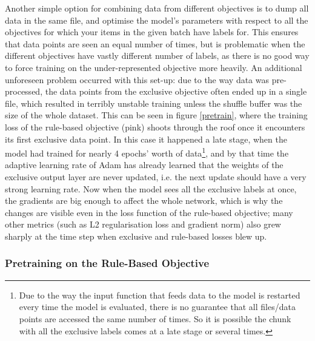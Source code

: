Another simple option for combining data from different objectives is to dump all data in the same file, and optimise the model's parameters with respect to all the objectives for which your items in the given batch have labels for.
This ensures that data points are seen an equal number of times, but is problematic when the different objectives have vastly different number of labels, as there is no good way to force training on the under-represented objective more heavily.
An additional unforeseen problem occurred with this set-up: due to the way data was pre-processed, the data points from the exclusive objective often ended up in a single file, which resulted in terribly unstable training unless the shuffle buffer was the size of the whole dataset.
This can be seen in figure \ref{pretrain}, where the training loss of the rule-based objective (pink) shoots through the roof once it encounters its first exclusive data point.
In this case it happened a late stage, when the model had trained for nearly 4 epochs' worth of data\footnote{Due to the way the input function that feeds data to the model is restarted every time the model is evaluated, there is no guarantee that all files/data points are accessed the same number of times. So it is possible the chunk with all the exclusive labels comes at a late stage or several times.}, and by that time the adaptive learning rate of Adam has already learned that the weights of the exclusive output layer are never updated, i.e. the next update should have a very strong learning rate.
Now when the model sees all the exclusive labels at once, the gradients are big enough to affect the whole network, which is why the changes are visible even in the loss function of the rule-based objective; many other metrics (such as L2 regularisation loss and gradient norm) also grew sharply at the time step when exclusive and rule-based losses blew up.

\subsubsection{Pretraining on the Rule-Based Objective}

